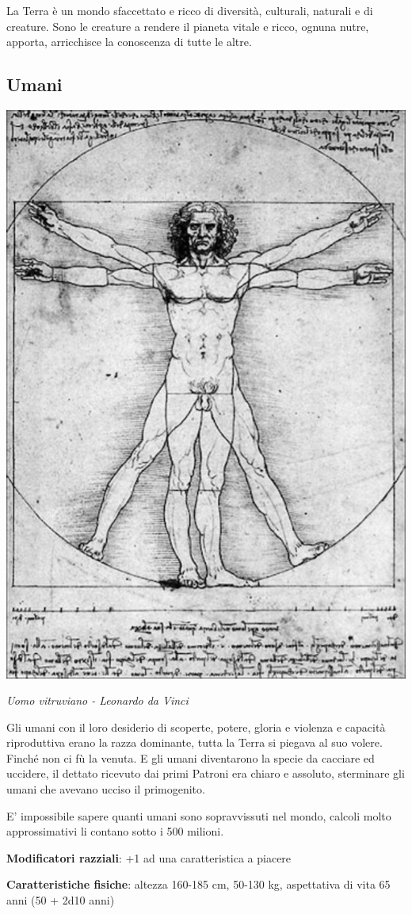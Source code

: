 \begin{multicols}{2}

La Terra è un mondo sfaccettato e ricco di diversità, culturali, naturali e di creature.
Sono le creature a rendere il pianeta vitale e ricco, ognuna nutre, apporta, arricchisce la conoscenza di tutte le altre.


\subsection{Umani}\label{umani}


\begin{center}
\includegraphics[height=0.7\linewidth]{immagini/uomovitruviano2.png}

\emph{Uomo vitruviano - Leonardo da Vinci}
\end{center}


Gli umani con il loro desiderio di scoperte, potere, gloria e violenza e capacità riproduttiva erano la razza dominante, tutta la Terra si piegava al suo volere. Finché non ci fù la venuta.
E gli umani diventarono la specie da cacciare ed uccidere, il dettato ricevuto dai primi Patroni era chiaro e assoluto, sterminare gli umani che avevano ucciso il primogenito.

E' impossibile sapere quanti umani sono sopravvissuti nel mondo, calcoli molto approssimativi li contano sotto i 500 milioni.

\textbf{Modificatori razziali}: +1 ad una caratteristica a piacere

\textbf{Caratteristiche fisiche}: altezza 160-185 cm, 50-130 kg, aspettativa di vita 65 anni (50 + 2d10 anni)


\end{multicols}

